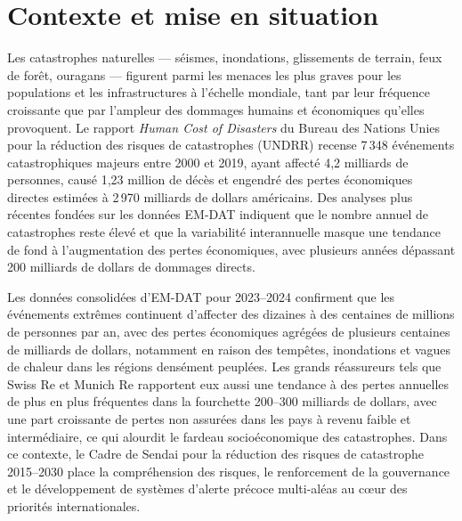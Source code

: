 \label{sec:Introduction}

\section{Contexte et mise en situation}\label{sec:Contexte}

Les catastrophes naturelles — séismes, inondations, glissements de terrain, feux de forêt, ouragans — figurent parmi les menaces les plus graves pour les populations et les infrastructures à l'échelle mondiale, tant par leur fréquence croissante que par l'ampleur des dommages humains et économiques qu'elles provoquent\cite{undrr2020,noauthor_disaster_nodate}. Le rapport \emph{Human Cost of Disasters} du Bureau des Nations Unies pour la réduction des risques de catastrophes (UNDRR) recense 7\,348 événements catastrophiques majeurs entre 2000 et 2019, ayant affecté 4{,}2 milliards de personnes, causé 1{,}23 million de décès et engendré des pertes économiques directes estimées à 2\,970 milliards de dollars américains\cite{undrr2020}. Des analyses plus récentes fondées sur les données EM-DAT indiquent que le nombre annuel de catastrophes reste élevé et que la variabilité interannuelle masque une tendance de fond à l'augmentation des pertes économiques, avec plusieurs années dépassant 200 milliards de dollars de dommages directs\cite{noauthor_number_nodate,burgueno_salas_global_nodate}. 

Les données consolidées d'EM-DAT pour 2023--2024 confirment que les événements extrêmes continuent d'affecter des dizaines à des centaines de millions de personnes par an, avec des pertes économiques agrégées de plusieurs centaines de milliards de dollars, notamment en raison des tempêtes, inondations et vagues de chaleur dans les régions densément peuplées\cite{noauthor_number_nodate,burgueno_salas_global_nodate}. Les grands réassureurs tels que Swiss Re et Munich Re rapportent eux aussi une tendance à des pertes annuelles de plus en plus fréquentes dans la fourchette 200--300 milliards de dollars, avec une part croissante de pertes non assurées dans les pays à revenu faible et intermédiaire, ce qui alourdit le fardeau socioéconomique des catastrophes\cite{swiss_re_2025,munich_re_2025}. Dans ce contexte, le Cadre de Sendai pour la réduction des risques de catastrophe 2015--2030 place la compréhension des risques, le renforcement de la gouvernance et le développement de systèmes d'alerte précoce multi-aléas au cœur des priorités internationales\cite{UNDRR2015Sendai}.

